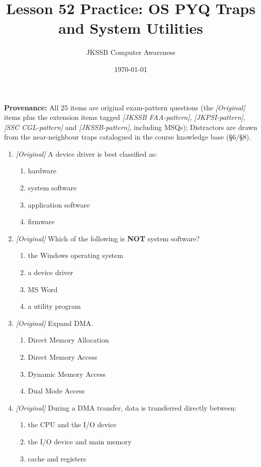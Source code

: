 \documentclass[11pt]{article}
\title{Lesson 52 Practice: OS PYQ Traps and System Utilities}
\author{JKSSB Computer Awareness}
\date{\today}
\begin{document}
\maketitle
\noindent\textbf{Provenance:} All 25 items are original exam-pattern questions (the \textit{[Original]} items plus the extension items tagged \textit{[JKSSB FAA-pattern]}, \textit{[JKPSI-pattern]}, \textit{[SSC CGL-pattern]} and \textit{[JKSSB-pattern]}, including MSQs); Distractors are drawn from the near-neighbour traps catalogued in the course knowledge base (\S6/\S8).


\begin{enumerate}[label=\textbf{Q\arabic*.}, leftmargin=*]
\item \textit{[Original]} A device driver is best classified as:
  \begin{enumerate}[label=\Alph*.]
    \item hardware
    \item system software
    \item application software
    \item firmware
  \end{enumerate}
\item \textit{[Original]} Which of the following is \textbf{NOT} system
  software?
  \begin{enumerate}[label=\Alph*.]
    \item the Windows operating system
    \item a device driver
    \item MS Word
    \item a utility program
  \end{enumerate}
\item \textit{[Original]} Expand DMA.
  \begin{enumerate}[label=\Alph*.]
    \item Direct Memory Allocation
    \item Direct Memory Access
    \item Dynamic Memory Access
    \item Dual Mode Access
  \end{enumerate}
\item \textit{[Original]} During a DMA transfer, data is transferred directly
  between:
  \begin{enumerate}[label=\Alph*.]
    \item the CPU and the I/O device
    \item the I/O device and main memory
    \item cache and registers

\end{enumerate}
\end{enumerate}
\end{document}
